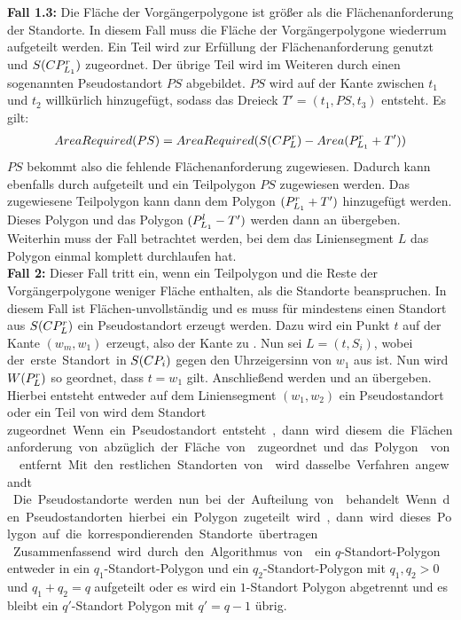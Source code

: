 \documentclass[ngerman]{seminarbeitrag}
\begin{document}
\textbf{Fall 1.3:} Die Fläche der Vorgängerpolygone ist größer als die Flächenanforderung der Standorte. In diesem Fall muss die Fläche der Vorgängerpolygone wiederrum aufgeteilt werden. Ein Teil wird zur Erfüllung der Flächenanforderung genutzt und $S(CP^{r}_{L_{1}})$ zugeordnet. Der übrige Teil wird im Weiteren durch einen sogenannten Pseudostandort $PS$ abgebildet. $PS$ wird auf der Kante zwischen $t_{1}$ und $t_{2}$ willkürlich hinzugefügt, sodass das Dreieck $T' = (t_{1}, PS, t_{3})$ entsteht. Es gilt:
\begin{align*}AreaRequired(PS)=AreaRequired(S(CP_{L}^{r}) - Area(P_{L_{1}}^{r} + T')) \end{align*}
$PS$ bekommt also die fehlende Flächenanforderung zugewiesen. Dadurch kann \linebreak {} ebenfalls durch \noncon aufgeteilt und ein Teilpolygon $PS$ zugewiesen werden. Das zugewiesene Teilpolygon kann dann dem Polygon $(P_{L_{1}}^{r} + T')$ hinzugefügt werden. Dieses Polygon und das Polygon $(P_{L_{1}}^{l} -T')$ werden dann an \daa übergeben. \\

Weiterhin muss der Fall betrachtet werden, bei dem das Liniensegment $L$ das Polygon einmal komplett durchlaufen hat.\\
\textbf{Fall 2:} Dieser Fall tritt ein, wenn ein Teilpolygon und die Reste der Vorgängerpolygone weniger Fläche enthalten, als die Standorte beanspruchen. In diesem Fall ist \cpi Flächen-unvollständig und es muss für mindestens einen Standort aus $S(CP_{L}^{r})$ ein Pseudostandort erzeugt werden. Dazu wird ein Punkt $t$ auf der Kante $(w_{m}, w_{1})$ erzeugt, also der Kante zu \next{\mcpi}. Nun sei $L = (t, S_{i})$, wobei \si der erste Standort in $S(CP_{i})$ gegen den Uhrzeigersinn von $w_{1}$ aus ist. Nun wird $W(P_{L}^{r})$ so geordnet, dass $t = w_{1}$ gilt. Anschließend werden \prl und \pll an \daa übergeben. Hierbei entsteht entweder auf dem Liniensegment $(w_{1}, w_{2})$ ein Pseudostandort oder ein Teil von \prl wird dem Standort \si zugeordnet. Wenn ein Pseudostandort entsteht, dann wird diesem die Flächenanforderung von \si abzüglich der Fläche von \prl zugeordnet und das Polygon \prl von \cpi entfernt. Mit den restlichen Standorten von \cpi wird dasselbe Verfahren angewandt.\\
Die Pseudostandorte werden nun bei der Aufteilung von \next{\mcpi}behandelt. Wenn den Pseudostandorten hierbei ein Polygon zugeteilt wird, dann wird dieses Polygon auf die korrespondierenden Standorte übertragen.\\
Zusammenfassend wird durch den Algorithmus von \noncon ein $q$-Standort-Polygon entweder in ein $q_{1}$-Standort-Polygon und ein $q_{2}$-Standort-Polygon mit $q_{1}, q_{2} > 0$ und $q_{1} + q_{2} = q$ aufgeteilt oder es wird ein $1$-Standort Polygon abgetrennt und es bleibt ein $q'$-Standort Polygon mit $q' = q - 1$ übrig.
\end{document}
